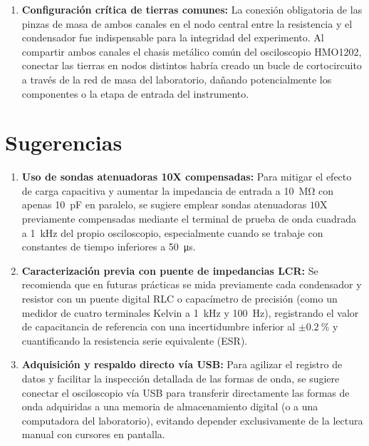 \begin{enumerate}
    \item \textbf{Configuración crítica de tierras comunes:} La conexión obligatoria de las pinzas de masa de ambos canales en el nodo central entre la resistencia y el condensador fue indispensable para la integridad del experimento. Al compartir ambos canales el chasis metálico común del osciloscopio HMO1202, conectar las tierras en nodos distintos habría creado un bucle de cortocircuito a través de la red de masa del laboratorio, dañando potencialmente los componentes o la etapa de entrada del instrumento.
\end{enumerate}

\section{Sugerencias}
\label{sec:sugerencias}

\begin{enumerate}
    \item \textbf{Uso de sondas atenuadoras 10X compensadas:} Para mitigar el efecto de carga capacitiva y aumentar la impedancia de entrada a \qty{10}{\mega\ohm} con apenas \qty{10}{\pico\farad} en paralelo, se sugiere emplear sondas atenuadoras $10\text{X}$ previamente compensadas mediante el terminal de prueba de onda cuadrada a \qty{1}{\kilo\hertz} del propio osciloscopio, especialmente cuando se trabaje con constantes de tiempo inferiores a \qty{50}{\micro\second}.
    
    \item \textbf{Caracterización previa con puente de impedancias LCR:} Se recomienda que en futuras prácticas se mida previamente cada condensador y resistor con un puente digital RLC o capacímetro de precisión (como un medidor de cuatro terminales Kelvin a \qty{1}{\kilo\hertz} y \qty{100}{\hertz}), registrando el valor de capacitancia de referencia con una incertidumbre inferior al $\pm\qty{0,2}{\percent}$ y cuantificando la resistencia serie equivalente (ESR).
    
    \item \textbf{Adquisición y respaldo directo vía USB:} Para agilizar el registro de datos y facilitar la inspección detallada de las formas de onda, se sugiere conectar el osciloscopio vía USB para transferir directamente las formas de onda adquiridas a una memoria de almacenamiento digital (o a una computadora del laboratorio), evitando depender exclusivamente de la lectura manual con cursores en pantalla.
\end{enumerate}

